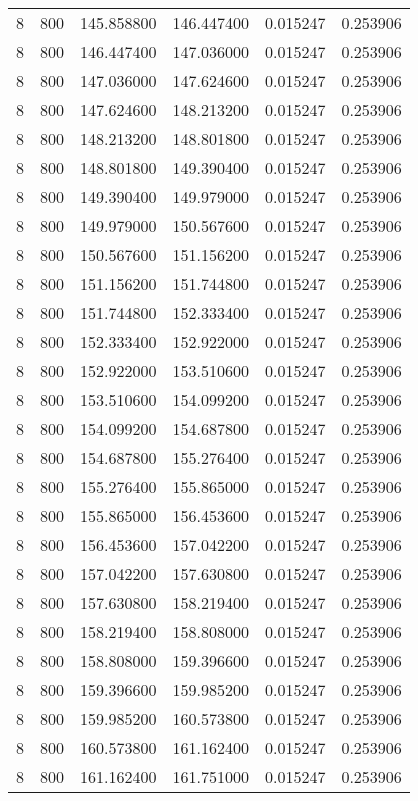 \begin{longtable}{rrrrrr}
8 & 800 & 145.858800 & 146.447400 & 0.015247 & 0.253906 \\
8 & 800 & 146.447400 & 147.036000 & 0.015247 & 0.253906 \\
8 & 800 & 147.036000 & 147.624600 & 0.015247 & 0.253906 \\
8 & 800 & 147.624600 & 148.213200 & 0.015247 & 0.253906 \\
8 & 800 & 148.213200 & 148.801800 & 0.015247 & 0.253906 \\
8 & 800 & 148.801800 & 149.390400 & 0.015247 & 0.253906 \\
8 & 800 & 149.390400 & 149.979000 & 0.015247 & 0.253906 \\
8 & 800 & 149.979000 & 150.567600 & 0.015247 & 0.253906 \\
8 & 800 & 150.567600 & 151.156200 & 0.015247 & 0.253906 \\
8 & 800 & 151.156200 & 151.744800 & 0.015247 & 0.253906 \\
8 & 800 & 151.744800 & 152.333400 & 0.015247 & 0.253906 \\
8 & 800 & 152.333400 & 152.922000 & 0.015247 & 0.253906 \\
8 & 800 & 152.922000 & 153.510600 & 0.015247 & 0.253906 \\
8 & 800 & 153.510600 & 154.099200 & 0.015247 & 0.253906 \\
8 & 800 & 154.099200 & 154.687800 & 0.015247 & 0.253906 \\
8 & 800 & 154.687800 & 155.276400 & 0.015247 & 0.253906 \\
8 & 800 & 155.276400 & 155.865000 & 0.015247 & 0.253906 \\
8 & 800 & 155.865000 & 156.453600 & 0.015247 & 0.253906 \\
8 & 800 & 156.453600 & 157.042200 & 0.015247 & 0.253906 \\
8 & 800 & 157.042200 & 157.630800 & 0.015247 & 0.253906 \\
8 & 800 & 157.630800 & 158.219400 & 0.015247 & 0.253906 \\
8 & 800 & 158.219400 & 158.808000 & 0.015247 & 0.253906 \\
8 & 800 & 158.808000 & 159.396600 & 0.015247 & 0.253906 \\
8 & 800 & 159.396600 & 159.985200 & 0.015247 & 0.253906 \\
8 & 800 & 159.985200 & 160.573800 & 0.015247 & 0.253906 \\
8 & 800 & 160.573800 & 161.162400 & 0.015247 & 0.253906 \\
8 & 800 & 161.162400 & 161.751000 & 0.015247 & 0.253906 \\

\end{longtable}
